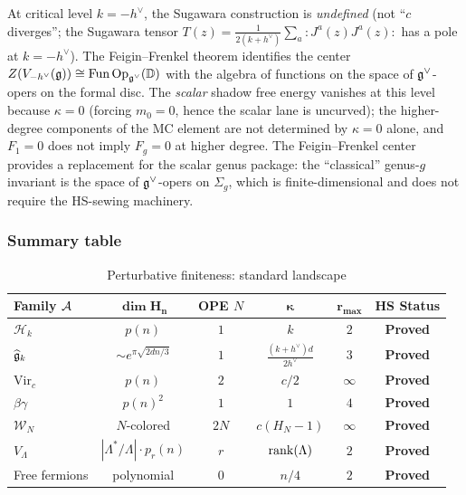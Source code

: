 \begin{remark}
At critical level $k = -h^\vee$, the Sugawara construction is \emph{undefined} (not ``$c$ diverges''; the Sugawara tensor $T(z) = \frac{1}{2(k+h^\vee)} \sum_a :J^a(z) J^a(z):$ has a pole at $k = -h^\vee$). The Feigin--Frenkel theorem identifies the center $Z(V_{-h^\vee}(\mathfrak{g})) \cong \mathrm{Fun}\,\mathrm{Op}_{\mathfrak{g}^\vee}(\mathbb{D})$ with the algebra of functions on the space of $\mathfrak{g}^\vee$-opers on the formal disc. The \emph{scalar} shadow free energy vanishes at this level because $\kappa = 0$ (forcing $m_0 = 0$, hence the scalar lane is uncurved); the higher-degree components of the MC element are not determined by $\kappa = 0$ alone, and $F_1 = 0$ does not imply $F_g = 0$ at higher degree. The Feigin--Frenkel center provides a replacement for the scalar genus package: the ``classical'' genus-$g$ invariant is the space of $\mathfrak{g}^\vee$-opers on $\Sigma_g$, which is finite-dimensional and does not require the HS-sewing machinery.
\end{remark}

\subsubsection{Summary table}

\begin{table}[ht]
\centering
\caption{Perturbative finiteness: standard landscape}
\label{tab:thqg-I-finiteness-summary}
\renewcommand{\arraystretch}{1.4}
{\footnotesize
\begin{tabular}{|l|c|c|c|c|c|}
\hline
\textbf{Family $\mathcal{A}$} & $\boldsymbol{\dim H_n}$ & \textbf{OPE $N$} & $\boldsymbol{\kappa}$ & $\boldsymbol{r_{\max}}$ & \textbf{HS Status} \\
\hline
$\mathcal{H}_k$ & $p(n)$ & $1$ & $k$ & $2$ & \textbf{Proved} \\
\hline
$\widehat{\mathfrak{g}}_k$ & $\sim e^{\pi\sqrt{2dn/3}}$ & $1$ & $\frac{(k+h^\vee)d}{2h^\vee}$ & $3$ & \textbf{Proved} \\
\hline
$\mathrm{Vir}_c$ & $p(n)$ & $2$ & $c/2$ & $\infty$ & \textbf{Proved} \\
\hline
$\beta\gamma$ & $p(n)^2$ & $1$ & $1$ & $4$ & \textbf{Proved} \\
\hline
$\mathcal{W}_N$ & $N$-colored & $2N$ & $c(H_N - 1)$ & $\infty$ & \textbf{Proved} \\
\hline
$V_\Lambda$ & $|\Lambda^*/\Lambda|\cdot p_r(n)$ & $r$ & $\operatorname{rank}(\Lambda)$ & $2$ & \textbf{Proved} \\
\hline
Free fermions & polynomial & $0$ & $n/4$ & $2$ & \textbf{Proved} \\
\hline
\end{tabular}}
\end{table}

